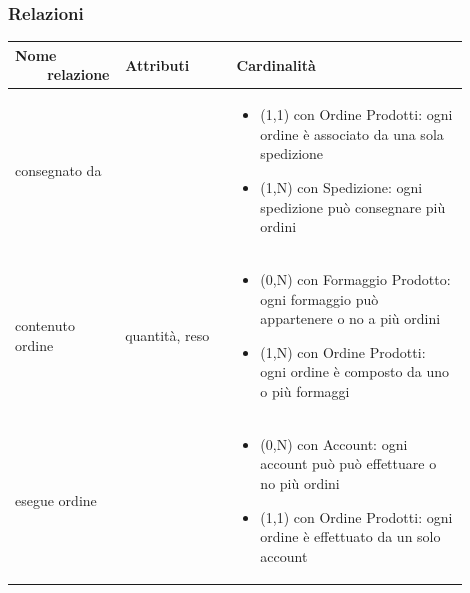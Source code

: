 \documentclass[12pt,a4paper]{article}
\begin{document}
\subsubsection{Relazioni}
\label{Store Relazioni}
\begin{center}

\setlength{\extrarowheight}{1.5pt}

\begin{longtable}{|p{0.16\linewidth}|p{0.24\linewidth}|p{0.50\linewidth}|}

\hline 
\textbf{Nome \ \ \ \ relazione} 	& \textbf{Attributi} & \textbf{Cardinalità}\\ 

    
\hline
consegnato da 				&   
					& \begin{itemize}
						\setlength{\itemindent}{-1em}
						\vspace{-15pt}
						\setlength\itemsep{-0.25em}
						\item (1,1) con Ordine Prodotti: ogni ordine è associato da una sola spedizione
						\item (1,N) con Spedizione: ogni spedizione può consegnare più ordini
					\end{itemize}\\ 

\hline
contenuto ordine 				&  quantità, reso 
					& \begin{itemize}
						\setlength{\itemindent}{-1em}
						\vspace{-25pt}
						\setlength\itemsep{-0.25em}
						\item (0,N) con Formaggio Prodotto: ogni formaggio può appartenere o no a più ordini
						\item (1,N) con Ordine Prodotti: ogni ordine è composto da uno o più formaggi
					\end{itemize}\\ 

\hline
esegue ordine 				&  
 
					& \begin{itemize}
						\setlength{\itemindent}{-1em}
						\vspace{-25pt}
						\setlength\itemsep{-0.25em}
						\item (0,N) con Account: ogni account può può effettuare o no più ordini
						\item (1,1) con Ordine Prodotti: ogni ordine è effettuato da un solo account
					\end{itemize}\\ 


\end{longtable}
\end{center}
\end{document}

